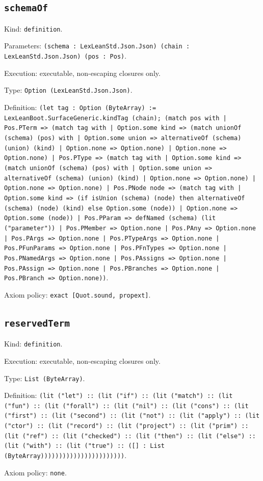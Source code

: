 \documentclass[11pt]{article}
\begin{document}
\subsection*{\texttt{schemaOf}}
\noindent Kind: \texttt{definition}.\par
\noindent Parameters: \texttt{(schema : LexLeanStd.Json.Json) (chain : LexLeanStd.Json.Json) (pos : Pos)}.\par
\noindent Execution: executable, non-escaping closures only.\par
\noindent Type: \texttt{Option (LexLeanStd.Json.Json)}.\par
\noindent Definition: \texttt{(let tag : Option (ByteArray) := LexLeanBoot.SurfaceGeneric.kindTag (chain); (match pos with | Pos.PTerm => (match tag with | Option.some kind => (match unionOf (schema) (pos) with | Option.some union => alternativeOf (schema) (union) (kind) | Option.none => Option.none) | Option.none => Option.none) | Pos.PType => (match tag with | Option.some kind => (match unionOf (schema) (pos) with | Option.some union => alternativeOf (schema) (union) (kind) | Option.none => Option.none) | Option.none => Option.none) | Pos.PNode node => (match tag with | Option.some kind => (if isUnion (schema) (node) then alternativeOf (schema) (node) (kind) else Option.some (node)) | Option.none => Option.some (node)) | Pos.PParam => defNamed (schema) (lit ("parameter")) | Pos.PMember => Option.none | Pos.PAny => Option.none | Pos.PArgs => Option.none | Pos.PTypeArgs => Option.none | Pos.PFunParams => Option.none | Pos.PFnTypes => Option.none | Pos.PNamedArgs => Option.none | Pos.PAssigns => Option.none | Pos.PAssign => Option.none | Pos.PBranches => Option.none | Pos.PBranch => Option.none))}.\par
\noindent Axiom policy: \texttt{exact [Quot.sound, propext]}.\par
\subsection*{\texttt{reservedTerm}}
\noindent Kind: \texttt{definition}.\par
\noindent Execution: executable, non-escaping closures only.\par
\noindent Type: \texttt{List (ByteArray)}.\par
\noindent Definition: \texttt{(lit ("let") :: (lit ("if") :: (lit ("match") :: (lit ("fun") :: (lit ("forall") :: (lit ("nil") :: (lit ("cons") :: (lit ("first") :: (lit ("second") :: (lit ("not") :: (lit ("apply") :: (lit ("ctor") :: (lit ("record") :: (lit ("project") :: (lit ("prim") :: (lit ("ref") :: (lit ("checked") :: (lit ("then") :: (lit ("else") :: (lit ("with") :: (lit ("true") :: ([] : List (ByteArray)))))))))))))))))))))))}.\par
\noindent Axiom policy: \texttt{none}.\par
\end{document}
